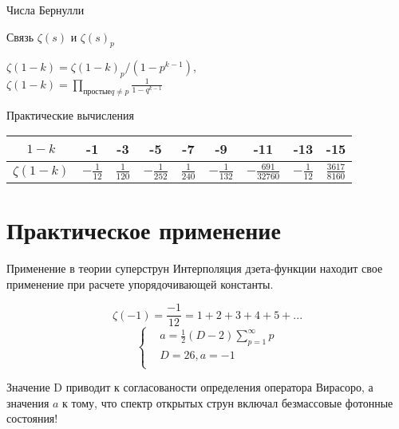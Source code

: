 \documentclass[newPxFont,sthlmFooter]{beamer}
\begin{document}
\begin{frame}{Числа Бернулли}
\begin{exampleblock}{Связь $\zeta(s)$ и $\zeta(s)_p$}
\begin{center}
$\zeta(1-k) = \zeta(1-k)_p/(1-p^{k-1})$, \\ 
$\zeta(1-k) = \prod \limits_{простые q \ne p} \frac{1}{1-q^{k-1}} $

\end{center}

\end{exampleblock}

Практические вычисления \\
\begin{tabular}{|c|c|c|c|c|c|c|c|c|}
\hline
$1-k$ & -1&-3&-5&-7&-9&-11&-13&-15 \\ \hline
$\zeta(1-k)$ & $-\frac{1}{12}$ &$ \frac{1}{120}$ & $-\frac{1}{252}$ & $\frac{1}{240}$ & $-\frac{1}{132}$ & $-\frac{691}{32760}$ & $-\frac{1}{12}$ &$ \frac{3617}{8160}$ \\ \hline
\end{tabular}
\end{frame}


%
%

\section{Практическое применение}


\begin{frame}{Применение в теории суперструн}
Интерполяция дзета-функции находит свое применение при расчете упорядочивающей константы.

$$ \zeta(-1) = \frac{-1}{12} = 1 + 2 + 3 + 4 + 5 + ...$$
\[
\left\{
\begin{aligned}	
& a = \frac{1}{2}(D-2)\sum \limits_{p = 1}^{\infty} p\\
& D = 26, a = -1\\
\end{aligned}
\right.
\]

Значение D приводит к согласованости определения оператора Вирасоро, а значения $a$ к тому, что спектр открытых струн     включал безмассовые фотонные состояния!
\vspace{20mm}
\end{frame}
\end{document}
